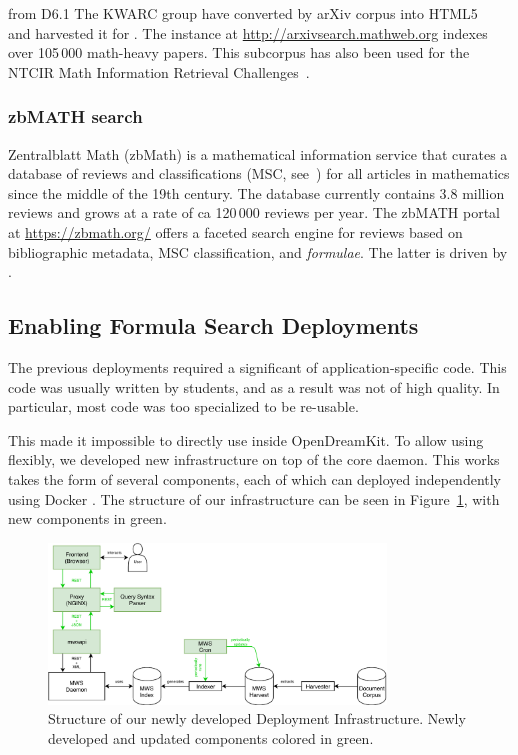 \begin{newpart}{from D6.1}
The KWARC group have converted by arXiv corpus into HTML5~\cite{StaKoh:tlcspx10} and
harvested it for \MWS. The instance at \url{http://arxivsearch.mathweb.org}
indexes over 105\,000 math-heavy papers. This subcorpus has also been used for the NTCIR
Math Information Retrieval
Challenges~\cite{AizKohOun:nmpto13,AizKohOunSch:nmto14,AizKohOunSch:nmto16}.

\subsubsection{zbMATH search}

Zentralblatt Math (zbMath) is a mathematical information service that curates a database of reviews and classifications (MSC, see~\cite{MSC2010}) for all articles in mathematics since the middle of the 19th century. The database currently contains 3.8 million reviews and grows at a rate of ca 120\,000 reviews per year.
The zbMATH portal at \url{https://zbmath.org/} offers a faceted search engine for reviews based on bibliographic metadata, MSC classification, and \emph{formulae}.
The latter is driven by \MWS. 

\end{newpart}

\subsection{Enabling Formula Search Deployments}\label{sec:software:deployment}

The previous \MWS deployments required a significant of application-specific code. 
This code was usually written by students, and as a result was not of high quality. 
In particular, most code was too specialized to be re-usable. 

This made it impossible to directly use \MWS inside OpenDreamKit. 
To allow using \MWS flexibly, we developed new infrastructure on top of the core \MWS daemon. 
This works takes the form of several components, each of which can deployed independently using Docker .
The structure of our infrastructure can be seen in Figure~\ref{fig:mwsdeployment}, with new components in green. 

\begin{figure}[ht]
  \includegraphics[width=0.8\textwidth]{mws_layout.pdf}
  \caption{Structure of our newly developed \MWS Deployment Infrastructure. Newly developed and updated components colored in green. }\label{fig:mwsdeployment}
\end{figure}

